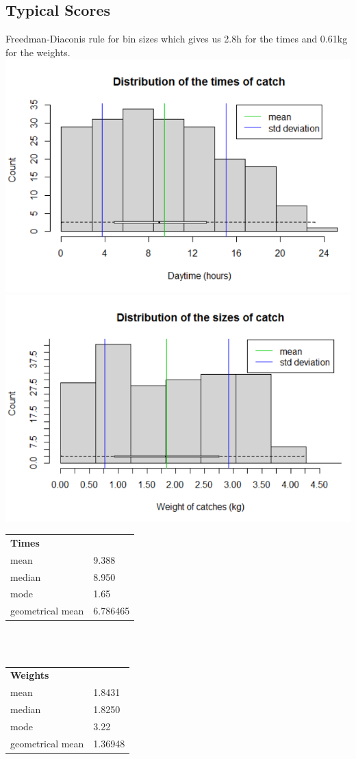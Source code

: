 \documentclass[12pt]{article} %
\begin{document}
\subsection{Typical Scores}
Freedman-Diaconis rule for bin sizes which gives us 2.8h for the times and 0.61kg for the weights.\\
\includegraphics[scale=.45]{times_distribution}
\includegraphics[scale=.45]{weights_distribution}
\newpage
\begin{multicols}{2}
\begin{tabular}{ll}
\textbf{Times}&\\
mean&9.388\\
median&8.950\\
mode&1.65\\
geometrical mean&6.786465\\
\end{tabular}
\\\\
\begin{tabular}{ll}
\textbf{Weights}&\\
mean&1.8431\\
median&1.8250\\
mode&3.22\\
geometrical mean&1.36948\\
\end{tabular}
\end{multicols}
\end{document}
